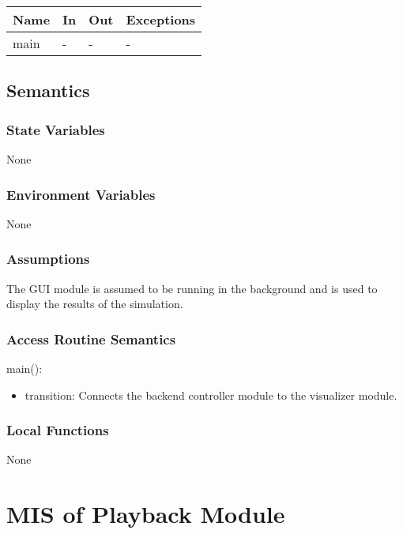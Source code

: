 \documentclass[12pt, titlepage]{article}
\begin{document}
\begin{center}
\begin{tabular}{p{2cm} p{4cm} p{4cm} p{2cm}}
\hline
\textbf{Name} & \textbf{In} & \textbf{Out} & \textbf{Exceptions} \\
\hline
main & - & - & - \\
\hline
\end{tabular}
\end{center}

\subsection{Semantics}

\subsubsection{State Variables}

None

\subsubsection{Environment Variables}

None

\subsubsection{Assumptions}


The GUI module is assumed to be running in the background and is used to display the results of the simulation.

\subsubsection{Access Routine Semantics}

\noindent main():
\begin{itemize}
\item transition: Connects the backend controller module to the visualizer module.
\end{itemize}


\subsubsection{Local Functions}

None

\newpage

\section{MIS of Playback Module} \label{Module_playback} 
\end{document}
